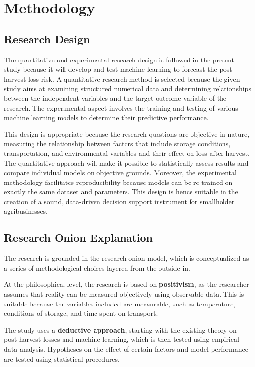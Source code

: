 \chapter{Methodology}
\label{chap:method}

\section{Research Design}

The quantitative and experimental research design is followed in the present study because it will
develop and test machine learning to forecast the post-harvest loss risk. A quantitative research
method is selected because the given study aims at examining structured numerical data and
determining relationships between the independent variables and the target outcome variable of the
research. The experimental aspect involves the training and testing of various machine learning
models to determine their predictive performance.

This design is appropriate because the research questions are objective in nature, measuring the
relationship between factors that include storage conditions, transportation, and environmental
variables and their effect on loss after harvest. The quantitative approach will make it possible
to statistically assess results and compare individual models on objective grounds. Moreover, the
experimental methodology facilitates reproducibility because models can be re-trained on exactly
the same dataset and parameters. This design is hence suitable in the creation of a sound,
data-driven decision support instrument for smallholder agribusinesses.


\section{Research Onion Explanation}

The research is grounded in the research onion model, which is conceptualized as a series of
methodological choices layered from the outside in.

At the philosophical level, the research is based on \textbf{positivism}, as the researcher assumes
that reality can be measured objectively using observable data. This is suitable because the
variables included are measurable, such as temperature, conditions of storage, and time spent on
transport.

The study uses a \textbf{deductive approach}, starting with the existing theory on post-harvest
losses and machine learning, which is then tested using empirical data analysis. Hypotheses on the
effect of certain factors and model performance are tested using statistical procedures.

